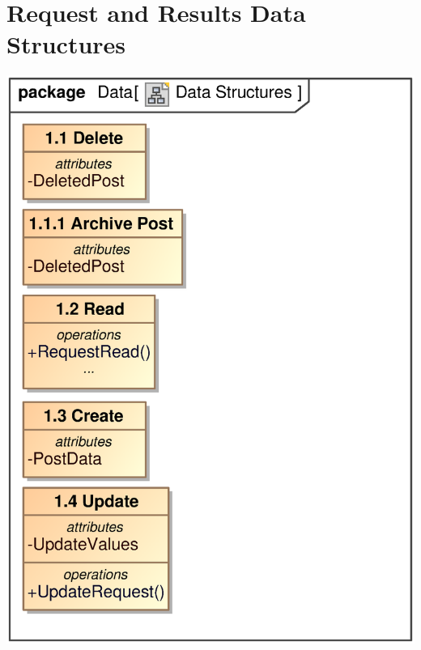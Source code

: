 \documentclass{scrreprt}
\begin{document}
\section{Request and Results Data Structures} 
\includegraphics[scale=.4]{DataStructuresCRUD.eps}
\end{document}
